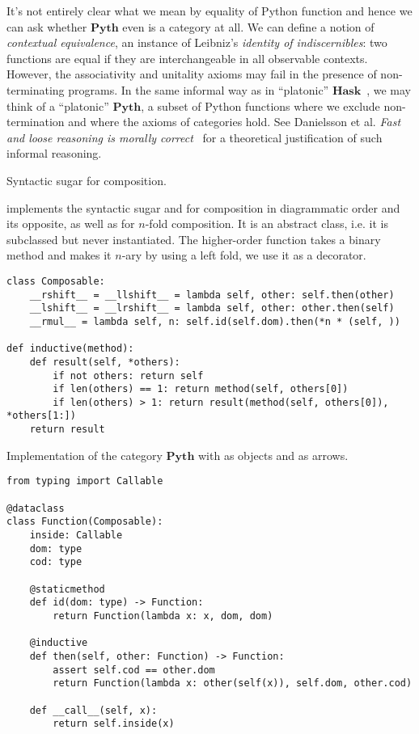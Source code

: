 \begin{remark}\label{remark:category-Pyth}
It's not entirely clear what we mean by equality of Python function and hence we can ask whether $\mathbf{Pyth}$ even is a category at all.
We can define a notion of \emph{contextual equivalence}, an instance of Leibniz's \emph{identity of indiscernibles}: two functions are equal if they are interchangeable in all observable contexts.
However, the associativity and unitality axioms may fail in the presence of non-terminating programs.
In the same informal way as in ``platonic'' $\mathbf{Hask}$~\cite{HaskellWikiContributors12}, we may think of a ``platonic'' $\mathbf{Pyth}$, a subset of Python functions where we exclude non-termination and where the axioms of categories hold.
See Danielsson et al. \emph{Fast and loose reasoning is morally correct}~\cite{DanielssonEtAl06} for a theoretical justification of such informal reasoning.
\end{remark}

\begin{python}
{\normalfont Syntactic sugar for composition.}

 implements the syntactic sugar \py{>>} and \py{<<} for composition in diagrammatic order and its opposite, as well as  for $n$-fold composition.
It is an abstract class, i.e. it is subclassed but never instantiated.
The higher-order function  takes a binary method and makes it $n$-ary by using a left fold, we use it as a decorator.

\begin{verbatim}
class Composable:
    __rshift__ = __llshift__ = lambda self, other: self.then(other)
    __lshift__ = __lrshift__ = lambda self, other: other.then(self)
    __rmul__ = lambda self, n: self.id(self.dom).then(*n * (self, ))

def inductive(method):
    def result(self, *others):
        if not others: return self
        if len(others) == 1: return method(self, others[0])
        if len(others) > 1: return result(method(self, others[0]), *others[1:])
    return result
\end{verbatim}
\end{python}

\begin{python}\label{listing:Function}
{\normalfont Implementation of the category $\mathbf{Pyth}$ with  as objects and  as arrows.}

\begin{verbatim}
from typing import Callable

@dataclass
class Function(Composable):
    inside: Callable
    dom: type
    cod: type

    @staticmethod
    def id(dom: type) -> Function:
        return Function(lambda x: x, dom, dom)

    @inductive
    def then(self, other: Function) -> Function:
        assert self.cod == other.dom
        return Function(lambda x: other(self(x)), self.dom, other.cod)

    def __call__(self, x):
        return self.inside(x)
\end{verbatim}
\end{python}

